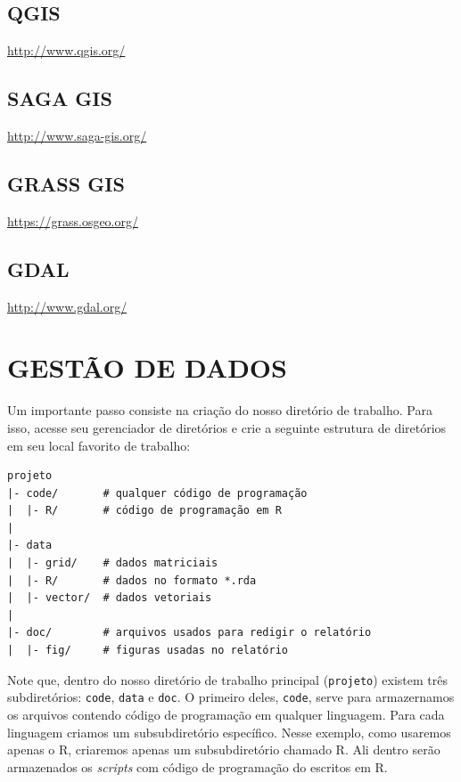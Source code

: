 \documentclass[]{book}
\begin{document}
\section{QGIS}\label{qgis}

\url{http://www.qgis.org/}

\section{SAGA GIS}\label{saga-gis}

\url{http://www.saga-gis.org/}

\section{GRASS GIS}\label{grass-gis}

\url{https://grass.osgeo.org/}

\section{GDAL}\label{gdal}

\url{http://www.gdal.org/}

\chapter{GESTÃO DE DADOS}\label{gestao-de-dados}

Um importante passo consiste na criação do nosso diretório de trabalho.
Para isso, acesse seu gerenciador de diretórios e crie a seguinte
estrutura de diretórios em seu local favorito de trabalho:

\begin{verbatim}
projeto
|- code/       # qualquer código de programação
|  |- R/       # código de programação em R
|
|- data
|  |- grid/    # dados matriciais
|  |- R/       # dados no formato *.rda
|  |- vector/  # dados vetoriais
|
|- doc/        # arquivos usados para redigir o relatório
|  |- fig/     # figuras usadas no relatório
\end{verbatim}

Note que, dentro do nosso diretório de trabalho principal
(\texttt{projeto}) existem três subdiretórios: \texttt{code},
\texttt{data} e \texttt{doc}. O primeiro deles, \texttt{code}, serve
para armazernamos os arquivos contendo código de programação em qualquer
linguagem. Para cada linguagem criamos um subsubdiretório específico.
Nesse exemplo, como usaremos apenas o R, criaremos apenas um
subsubdiretório chamado R. Ali dentro serão armazenados os
\emph{scripts} com código de programação do escritos em R.
\end{document}
